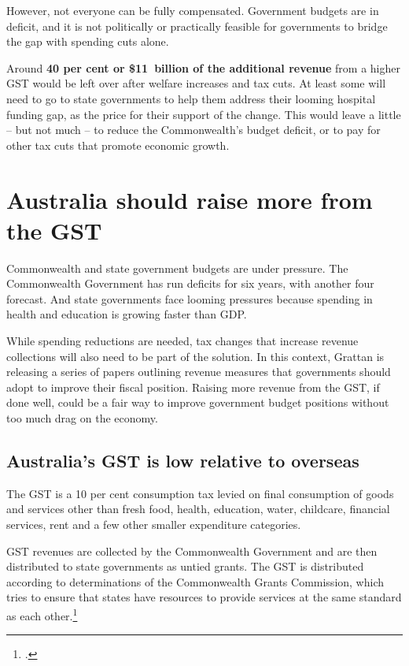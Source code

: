 \begin{overview}[-20pt]
However, not everyone can be fully compensated. Government budgets are in deficit, and it is not politically or practically feasible for governments to bridge the gap with spending cuts alone.

Around \textbf{40 per cent or \$11~billion of the additional revenue} from a higher GST would be left over after welfare increases and tax cuts. At least some will need to go to state governments to help them address their looming hospital funding gap, as the price for their support of the change. This would leave a little – but not much – to reduce the Commonwealth’s budget deficit, or to pay for other tax cuts that promote economic growth. 
\end{overview}
\addtolength{\columnsep}{-\overviewextra}

\chapter{Australia should raise more from the GST}\label{chapter:GST-1}
Commonwealth and state government budgets are under pressure. The Commonwealth Government has run deficits for six years, with another four forecast. And state governments face looming pressures because spending in health and education is growing faster than GDP.

While spending reductions are needed, tax changes that increase revenue collections will also need to be part of the solution. In this context, Grattan is releasing a series of papers outlining revenue measures that governments should adopt to improve their fiscal position.  Raising more revenue from the GST, if done well, could be a fair way to improve government budget positions without too much drag on the economy. 

\section{Australia's\DEVIATION{} GST is low relative to overseas}\label{sec:GST-1-1}
The GST is a 10 per cent consumption tax levied on final consumption of goods and services other than fresh food, health, education, water, childcare, financial services, rent and a few other smaller expenditure categories. 

GST revenues are collected by the Commonwealth Government and are then distributed to state governments as untied grants. The GST is distributed according to determinations of the Commonwealth Grants Commission, which tries to ensure that states have resources to provide services at the same standard as each other.\footcite[][12]{CGC2015} 
\pagebreak[1]

